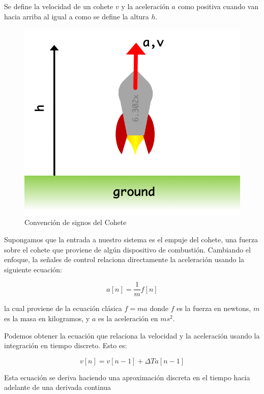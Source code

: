 \documentclass[12pt]{book}
\theoremstyle{definition}
\theoremstyle{remark}
\theoremstyle{plain}
\begin{document}
Se define la velocidad de un cohete $v$ y la aceleración $a$ como positiva cuando van hacia arriba al igual a como se define la altura $h$.

\begin{figure}
\centering
\includegraphics[width=5in]{hover_rocket_2.png}
\caption{Convención de signos del Cohete}
\label{fig801}
\end{figure}
Supongamos que la entrada a nuestro sistema es el empuje del cohete, una fuerza sobre el cohete que proviene de algún dispositivo de combustión. Cambiando el enfoque, la señales de control relaciona directamente la aceleración usando la siguiente ecuación:

\begin{equation}
\label{equ800}
a[n] = \frac{1}{m}f[n]
\end{equation}

la cual proviene de la ecuación clásica $f=ma$ donde $f$ es la fuerza en newtons, $m$ es la masa en kilogramos, y $a$ es la aceleración en $m s ^{2}$.

Podemos obtener la ecuación que relaciona la velocidad y la aceleración usando la integración en tiempo discreto. Esto es:

\begin{equation}
\label{equ801}
v[n] = v[n-1] + \Delta T a[n-1]
\end{equation}

Esta ecuación se deriva haciendo una aproximación discreta en el tiempo hacia adelante de una derivada continua
\end{document}
